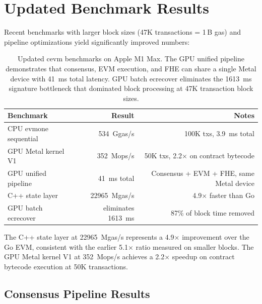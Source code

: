 \documentclass[11pt]{article}
\begin{document}
\section{Updated Benchmark Results}
\label{sec:updated}

Recent benchmarks with larger block sizes (47K transactions = 1\,B gas) and pipeline
optimizations yield significantly improved numbers:

\begin{table}[h]
\centering
\small
\begin{tabular}{lrr}
\toprule
\textbf{Benchmark} & \textbf{Result} & \textbf{Notes} \\
\midrule
CPU evmone sequential       & \SI{534}{Ggas/s}     & 100K txs, \SI{3.9}{ms} total \\
GPU Metal kernel V1         & \SI{352}{Mops/s}     & 50K txs, 2.2$\times$ on contract bytecode \\
GPU unified pipeline        & \SI{41}{ms} total    & Consensus + EVM + FHE, same Metal device \\
C++ state layer             & \SI{22965}{Mgas/s}   & 4.9$\times$ faster than Go \\
GPU batch ecrecover         & eliminates \SI{1613}{ms} & 87\% of block time removed \\
\bottomrule
\end{tabular}
\caption{Updated cevm benchmarks on Apple M1 Max. The GPU unified pipeline demonstrates
that consensus, EVM execution, and FHE can share a single Metal device with \SI{41}{ms}
total latency. GPU batch ecrecover eliminates the \SI{1613}{ms} signature bottleneck that
dominated block processing at 47K transaction block sizes.}
\label{tab:updated}
\end{table}

The C++ state layer at \SI{22965}{Mgas/s} represents a 4.9$\times$ improvement over the
Go EVM, consistent with the earlier 5.1$\times$ ratio measured on smaller blocks. The
GPU Metal kernel V1 at \SI{352}{Mops/s} achieves a 2.2$\times$ speedup on contract
bytecode execution at 50K transactions.

\subsection{Consensus Pipeline Results}
\end{document}

